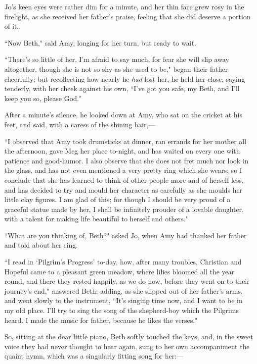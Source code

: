 Jo's keen eyes were rather dim for a minute, and her
thin face grew rosy in the firelight, as she received her
father's praise, feeling that she did deserve a portion
of it.

``Now Beth," said Amy, longing for her turn, but ready to wait.

``There's so little of her, I'm afraid to
say much, for fear she will slip away altogether, though she is not so
shy as she used to be," began their father cheerfully; but recollecting
how nearly he \emph{had} lost her, he held her close, saying tenderly,
with her cheek against his own, ``I've got you safe, my
Beth, and I'll keep you so, please God."

After a minute's silence, he looked down at Amy, who sat
on the cricket at his feet, and said, with a caress of the shining
hair,---

``I observed that Amy took drumsticks at dinner, ran errands for her
mother all the afternoon, gave Meg her place to-night, and has waited on
every one with patience and good-humor. I also observe that she does not
fret much nor look in the glass, and has not even mentioned a very
pretty ring which she wears; so I conclude that she has learned to think
of other people more and of herself less, and has decided to try and
mould her character as carefully as she moulds her little clay figures.
I am glad of this; for though I should be very proud of a graceful
statue made by her, I shall be infinitely prouder of a lovable daughter,
with a talent for making life beautiful to herself and others."

``What are you thinking of, Beth?" asked Jo, when Amy had thanked her
father and told about her ring.

``I read in `Pilgrim's
Progress' to-day, how, after many troubles, Christian
and Hopeful came to a pleasant green meadow, where lilies bloomed all
the year round, and there they rested happily, as we do now, before they
went on to their journey's end," answered Beth; adding,
as she slipped out of her father's arms, and went slowly
to the instrument, ``It's singing time now, and I want to
be in my old place. I'll try to sing the song of the
shepherd-boy which the Pilgrims heard. I made the music for father,
because he likes the verses."

So, sitting at the dear little piano, Beth softly touched the keys, and,
in the sweet voice they had never thought to hear again, sung to her own
accompaniment the quaint hymn, which was a singularly fitting song for
her:---

